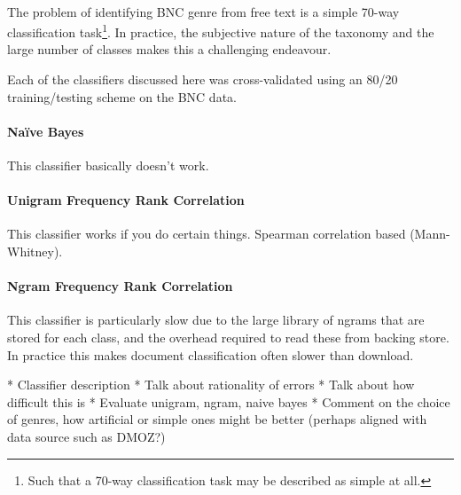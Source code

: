 
\paragraph{}
The problem of identifying BNC genre from free text is a simple 70-way classification task\footnote{Such that a 70-way classification task may be described as simple at all.}.  In practice, the subjective nature of the taxonomy and the large number of classes makes this a challenging endeavour.

Each of the classifiers discussed here was cross-validated using an 80/20 training/testing scheme on the BNC data.  

\paragraph{Na\"ive Bayes}
This classifier basically doesn't work.


\paragraph{Unigram Frequency Rank Correlation}
This classifier works if you do certain things.  Spearman correlation based (Mann-Whitney).

\paragraph{Ngram Frequency Rank Correlation}
This classifier is particularly slow due to the large library of ngrams that are stored for each class, and the overhead required to read these from backing store.  In practice this makes document classification often slower than download.






* Classifier description
* Talk about rationality of errors
* Talk about how difficult this is
* Evaluate unigram, ngram, naive bayes
* Comment on the choice of genres, how artificial or simple ones might be better (perhaps aligned with data source such as DMOZ?)



